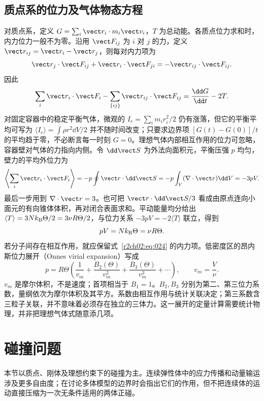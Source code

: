 \subsection{质点系的位力及气体物态方程}
\label{r2ch02:sec:system-virial}

对质点系，定义 $G=\sum_i\vect r_i\cdot m_i\vect v_i$，$T$ 为总动能。各质点位力求和时，内力位力一般不为零。沿用 $\vect F_{ij}$ 为 $i$ 对 $j$ 的力，定义 $\vect r_{ij}=\vect r_i-\vect r_j$，则每对内力项为
\[
 \vect r_j\cdot\vect F_{ij}+\vect r_i\cdot\vect F_{ji}
 =-\vect r_{ij}\cdot\vect F_{ij}.
\]
因此
\begin{equation}
 \sum_i\vect r_i\cdot\vect F_i
 -\sum_{\{ij\}}\vect r_{ij}\cdot\vect F_{ij}
 =\frac{\dd G}{\dd t}-2T.
 \label{r2ch02:eq:024}
\end{equation}
对固定容器中的稳定平衡气体，微观的 $I_r=\sum_i m_ir_i^2/2$ 仍有涨落，但它的平衡平均可写为 $\langle I_r\rangle=\int \rho r^2\dd V/2$ 并不随时间改变；只要求边界项 $[G(t)-G(0)]/t$ 的平均趋于零，不必断言每一时刻 $G=0$。理想气体内部相互作用的位力可忽略，容器壁对气体的力指向内侧。令 $\dd\vect S$ 为外法向面积元，平衡压强 $p$ 均匀，壁力的平均外位力为
\[
 \left\langle\sum_i\vect r_i\cdot\vect F_i\right\rangle
 =-p\oint\vect r\cdot\dd\vect S
 =-p\int_V(\nabla\cdot\vect r)\dd V=-3pV.
\]
最后一步用到 $\nabla\cdot\vect r=3$。也可把 $\vect r\cdot\dd\vect S/3$ 看成由原点连向小面元的有向锥体体积，再对闭合表面求和。平动能量均分给出 $\langle T\rangle=3Nk_{\rm B}\Theta/2=3\nu R\Theta/2$，与位力关系 $-3pV=-2\langle T\rangle$ 联立，得到
\[
 pV=Nk_{\rm B}\Theta=\nu R\Theta.
\]
若分子间存在相互作用，就应保留式~\eqref{r2ch02:eq:024} 的内力项。低密度区的昂内斯位力展开（Onnes virial expansion）写成
\[
 p=R\Theta\left(\frac1{v_m}+\frac{B_2(\Theta)}{v_m^2}
                  +\frac{B_3(\Theta)}{v_m^3}+\cdots\right),
 \qquad v_m=\frac V\nu.
\]
$v_m$ 是摩尔体积，不是速度；首项相当于 $B_1=1$。$B_2,B_3$ 分别为第二、第三位力系数，量纲依次为摩尔体积及其平方。系数由相互作用与统计关联决定；第三系数含三粒子关联，并不意味着必须存在独立的三体力。这一展开的定量计算需要统计物理，并非把理想气体式随意添几项。

\section{碰撞问题}
\label{r2ch02:sec:collision}

本节以质点、刚体及理想约束下的碰撞为主。连续弹性体中的应力传播和动量输运涉及更多自由度；在讨论多体模型的边界时会指出它们的作用，但不把连续体的运动直接压缩为一次无条件适用的两体正碰。

